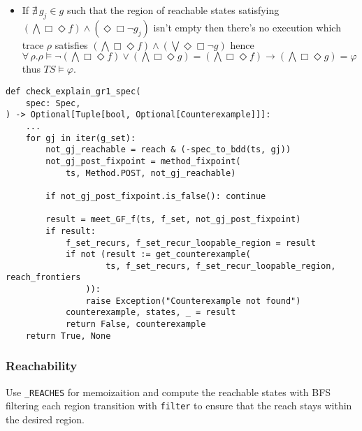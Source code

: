 \documentclass[11pt]{article}
\newcommand{\minline}[1]{{\footnotesize \texttt{#1}}}
\begin{document}
\begin{itemize}
	\item If $\nexists\, g_j \in g$ such that the region of reachable states
	      satisfying \\
	      $ \left(\bigwedge \Box\Diamond f \right) \wedge
		      \left( \Diamond\Box \neg g_j \right)$
	      isn't empty then there's no execution which trace $\rho$ satisfies
	      $ \left(\bigwedge \Box\Diamond f \right) \wedge
		      \left( \bigvee \Diamond\Box \neg g \right) $
	      hence\\
	      $ \forall\, \rho. \rho \vDash \neg\left( \bigwedge \Box\Diamond f \right) \vee
		      \left( \bigwedge \Box\Diamond g \right) =
		      \left( \bigwedge \Box\Diamond f \right) \to
		      \left( \bigwedge \Box\Diamond g \right) = \varphi $\\
	      thus $TS \vDash \varphi$.
\end{itemize}

\begin{verbatim}
def check_explain_gr1_spec(
    spec: Spec,
) -> Optional[Tuple[bool, Optional[Counterexample]]]:
    ...
    for gj in iter(g_set):
        not_gj_reachable = reach & (-spec_to_bdd(ts, gj))
        not_gj_post_fixpoint = method_fixpoint(
            ts, Method.POST, not_gj_reachable)

        if not_gj_post_fixpoint.is_false(): continue

        result = meet_GF_f(ts, f_set, not_gj_post_fixpoint)
        if result:
            f_set_recurs, f_set_recur_loopable_region = result
            if not (result := get_counterexample(
                    ts, f_set_recurs, f_set_recur_loopable_region, reach_frontiers
                )):
                raise Exception("Counterexample not found")
            counterexample, states, _ = result
            return False, counterexample
    return True, None
\end{verbatim}

\subsubsection{Reachability}

Use \minline{_REACHES} for memoizaition and compute the reachable states with
BFS filtering each region transition with \minline{filter} to ensure that the
reach stays within the desired region.
\end{document}
